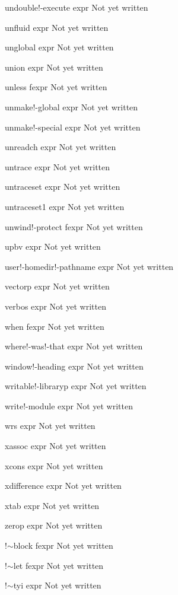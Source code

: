 \documentclass[a4paper,11pt]{article}
\begin{document}
\begin{description}
undouble!-execute expr
Not yet written

unfluid expr
Not yet written

unglobal expr
Not yet written

union expr
Not yet written

unless fexpr
Not yet written

unmake!-global expr
Not yet written

unmake!-special expr
Not yet written

unreadch expr
Not yet written

untrace expr
Not yet written

untraceset expr
Not yet written

untraceset1 expr
Not yet written

unwind!-protect fexpr
Not yet written

upbv expr
Not yet written

user!-homedir!-pathname expr
Not yet written

vectorp expr
Not yet written

verbos expr
Not yet written

when fexpr
Not yet written

where!-was!-that expr
Not yet written

window!-heading expr
Not yet written

writable!-libraryp expr
Not yet written

write!-module expr
Not yet written

wrs expr
Not yet written

xassoc expr
Not yet written

xcons expr
Not yet written

xdifference expr
Not yet written

xtab expr
Not yet written

zerop expr
Not yet written

!$\sim$block fexpr
Not yet written

!$\sim$let fexpr
Not yet written

!$\sim$tyi expr
Not yet written

\end{description}
\end{document}
